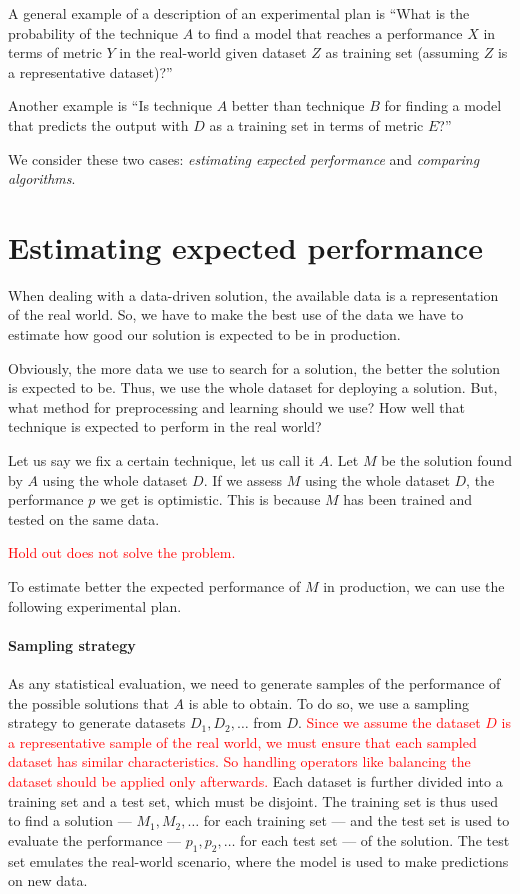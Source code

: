 A general example of a description of an experimental plan is ``What is the probability of
the technique $A$ to find a model that reaches a performance $X$ in terms of metric $Y$ in
the real-world given dataset $Z$ as training set (assuming $Z$ is a representative
dataset)?''

Another example is ``Is technique $A$ better than technique $B$ for finding a model that
predicts the output with $D$ as a training set in terms of metric $E$?''

We consider these two cases: \emph{estimating expected performance} and \emph{comparing
algorithms}.

\section{Estimating expected performance}
\label{sec:expected-performance}

When dealing with a data-driven solution, the available data is a representation of the
real world.  So, we have to make the best use of the data we have to estimate how good our
solution is expected to be in production.

Obviously, the more data we use to search for a solution, the better the solution is
expected to be.  Thus, we use the whole dataset for deploying a solution.  But, what
method for preprocessing and learning should we use?  How well that technique is
expected to perform in the real world?

Let us say we fix a certain technique, let us call it $A$.  Let $M$ be the solution found
by $A$ using the whole dataset $D$.  If we assess $M$ using the whole dataset $D$, the
performance $p$ we get is optimistic.  This is because $M$ has been trained and tested
on the same data.

\textcolor{red}{Hold out does not solve the problem.}

To estimate better the expected performance of $M$ in production, we can use the following
experimental plan.

\paragraph{Sampling strategy}  As any statistical evaluation, we need to generate samples
of the performance of the possible solutions that $A$ is able to obtain. To do so, we use
a sampling strategy to generate datasets $D_1, D_2, \ldots$ from $D$.  \textcolor{red}{%
Since we assume the dataset $D$ is a representative sample of the real world, we must
ensure that each sampled dataset has similar characteristics.  So handling operators like
balancing the dataset should be applied only afterwards.}  Each
dataset is further divided into a training set and a test set, which must be disjoint.
The training set is thus used to find a solution --- $M_1, M_2, \ldots$ for each
training set --- and the test set is used to evaluate the performance --- $p_1, p_2,
\ldots$ for each test set --- of the solution.  The test set emulates the real-world
scenario, where the model is used to make predictions on new data.

